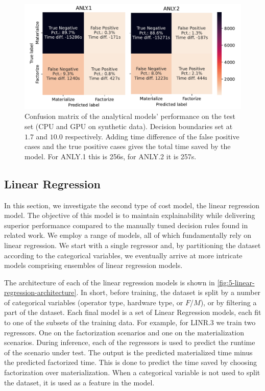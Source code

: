 \begin{figure}[ht]
  \centering
  \includegraphics[width=0.9\linewidth]{chapters/05_cost_estimation/figures/analytical-models-compare.pdf}
  \caption[Analytical Model Confusion Matrix]{Confusion matrix of the analytical models' performance on the test set (CPU and GPU on synthetic data). Decision boundaries set at $1.7$ and $10.0$ respectively. Adding time difference of the false positive cases and the true positive cases gives the total time saved by the model. For ANLY.1 this is 256s, for ANLY.2 it is 257s. }
  \label{fig:5-analytical-model-evaluation}
\end{figure}


\subsection{Linear Regression}
\label{subsec:5-linear-regression}
In this section, we investigate the second type of cost model, the linear regression model. The objective of this model is to maintain explainability while delivering superior performance compared to the manually tuned decision rules found in related work. We employ a range of models, all of which fundamentally rely on linear regression. We start with a single regressor and, by partitioning the dataset according to the categorical variables, we eventually arrive at more intricate models comprising ensembles of linear regression models.

The architecture of each of the linear regression models is shown in \autoref{fig:5-linear-regression-architecture}. In short, before training, the dataset is split by a number of categorical variables (operator type, hardware type, or $F$/$M$), or by filtering a part of the dataset. Each final model is a set of Linear Regression models, each fit to one of the subsets of the training data. For example, for LINR.3 we train two regressors. One on the factorization scenarios and one on the materialization scenarios. During inference, each of the regressors is used to predict the runtime of the scenario under test. The output is the predicted materialized time minus the predicted factorized time. This is done to predict the time saved by choosing factorization over materialization. When a categorical variable is not used to split the dataset, it is used as a feature in the model.

